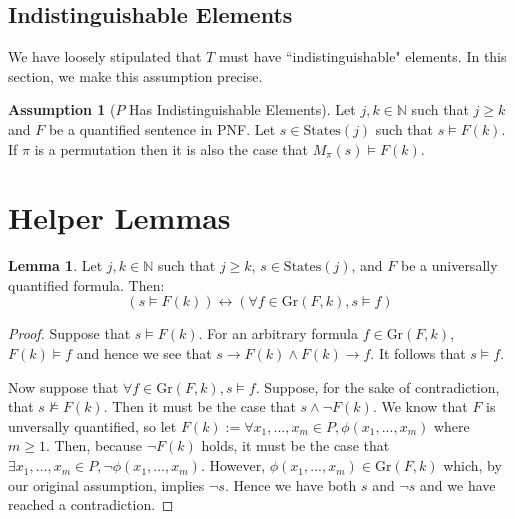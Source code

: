 \documentclass[12pt]{article}
\theoremstyle{definition}
\newtheorem{assumption}{Assumption}
\newtheorem{lemma}{Lemma}
\theoremstyle{remark}
\newcommand{\states}{\text{States}}
\newcommand{\gr}{\text{Gr}}
\begin{document}
\subsection{Indistinguishable Elements}
We have loosely stipulated that $T$ must have ``indistinguishable" elements.  In this section, we make this assumption precise.

\begin{assumption}[$P$ Has Indistinguishable Elements]
  \label{asmp:indist}
  Let $j,k \in \mathbb{N}$ such that $j \geq k$ and $F$ be a quantified sentence in PNF.  Let $s \in \states(j)$ such that $s \models F(k)$.  If $\pi$ is a permutation then it is also the case that $M_\pi(s) \models F(k)$.
\end{assumption}



\section{Helper Lemmas}

\begin{lemma}
  \label{lem:pnf-ground}
  Let $j,k \in \mathbb{N}$ such that $j \geq k$, $s \in \states(j)$, and $F$ be a universally quantified formula.  Then:
  $$(s \models F(k)) \leftrightarrow (\forall f \in \gr(F,k), s \models f)$$
\end{lemma}
\begin{proof}
  Suppose that $s \models F(k)$.  For an arbitrary formula $f \in \gr(F,k)$, $F(k) \models f$ and hence we see that $s \rightarrow F(k) \land F(k) \rightarrow f$.  It follows that $s \models f$.

  Now suppose that $\forall f \in \gr(F,k), s \models f$.  Suppose, for the sake of contradiction, that $s \not\models F(k)$.  Then it must be the case that $s \land \neg F(k)$.  We know that $F$ is unversally quantified, so let $F(k) := \forall x_1,...,x_m \in P, \phi(x_1,...,x_m)$ where $m \geq 1$.  Then, because $\neg F(k)$ holds, it must be the case that $\exists x_1,...,x_m \in P, \neg \phi(x_1,...,x_m)$.  However, $\phi(x_1,...,x_m) \in \gr(F,k)$ which, by our original assumption, implies $\neg s$.  Hence we have both $s$ and $\neg s$ and we have reached a contradiction.
\end{proof}
\end{document}

